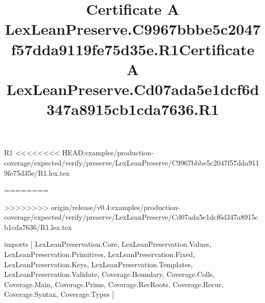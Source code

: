 \begin{lexlean}{R1}
<<<<<<<< HEAD:examples/production-coverage/expected/verify/preserve/LexLeanPreserve/C9967bbbe5c2047f57dda9119fe75d35e/R1.lex.tex
\title{Certificate A LexLeanPreserve.C9967bbbe5c2047f57dda9119fe75d35e.R1}
========
\title{Certificate A LexLeanPreserve.Cd07ada5e1dcf6d347a8915cb1cda7636.R1}
>>>>>>>> origin/release/v0.4:examples/production-coverage/expected/verify/preserve/LexLeanPreserve/Cd07ada5e1dcf6d347a8915cb1cda7636/R1.lex.tex
\begin{coremodule}
imports [
  LexLeanPreservation.Core,
  LexLeanPreservation.Values,
  LexLeanPreservation.Primitives,
  LexLeanPreservation.Fixed,
  LexLeanPreservation.Keys,
  LexLeanPreservation.Templates,
  LexLeanPreservation.Validate,
  Coverage.Boundary,
  Coverage.Colls,
  Coverage.Main,
  Coverage.Prims,
  Coverage.RecRoots,
  Coverage.Recur,
  Coverage.Syntax,
  Coverage.Types
]


\end{coremodule}
\end{lexlean}
